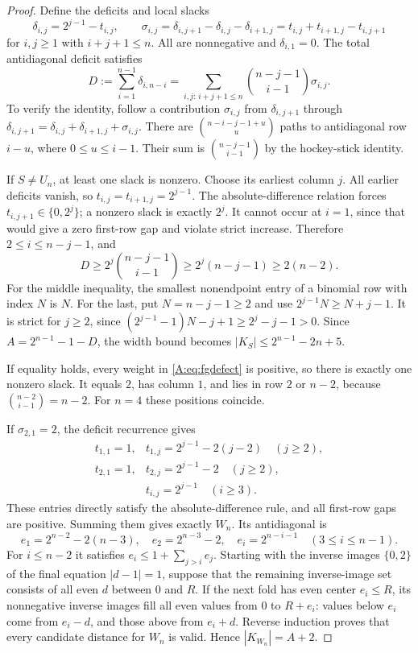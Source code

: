 \documentclass[11pt,a4paper]{article}
\theoremstyle{definition}
\theoremstyle{remark}
\numberwithin{equation}{section}
\begin{document}
\begin{proof}
Define the deficits and local slacks
\[
 \delta_{i,j}=2^{j-1}-t_{i,j},\qquad
 \sigma_{i,j}=\delta_{i,j+1}-\delta_{i,j}-\delta_{i+1,j}
             =t_{i,j}+t_{i+1,j}-t_{i,j+1}
\]
for $i,j\ge1$ with $i+j+1\le n$. All are nonnegative and
$\delta_{i,1}=0$. The total antidiagonal deficit satisfies
\begin{equation}\label{A:eq:fgdefect}
 D:=\sum_{i=1}^{n-1}\delta_{i,n-i}
   =\sum_{i,j:\,i+j+1\le n}
     \binom{n-j-1}{i-1}\sigma_{i,j}.
\end{equation}
To verify the identity, follow a contribution $\sigma_{i,j}$ from
$\delta_{i,j+1}$ through
$\delta_{i,j+1}=\delta_{i,j}+\delta_{i+1,j}+\sigma_{i,j}$.
There are $\binom{n-i-j-1+u}{u}$ paths to antidiagonal row $i-u$,
where $0\le u\le i-1$. Their sum is
$\binom{n-j-1}{i-1}$ by the hockey-stick identity.

If $S\ne U_n$, at least one slack is nonzero. Choose its earliest
column $j$. All earlier deficits vanish, so
$t_{i,j}=t_{i+1,j}=2^{j-1}$. The absolute-difference relation forces
$t_{i,j+1}\in\{0,2^j\}$; a nonzero slack is exactly $2^j$.
It cannot occur at $i=1$, since that would give a zero first-row gap
and violate strict increase. Therefore $2\le i\le n-j-1$, and
\[
 D\ge2^j\binom{n-j-1}{i-1}
   \ge2^j(n-j-1)\ge2(n-2).
\]
For the middle inequality, the smallest nonendpoint entry of a binomial
row with index $N$ is $N$. For the last, put $N=n-j-1\ge2$ and use
$2^{j-1}N\ge N+j-1$. It is strict for $j\ge2$, since
$(2^{j-1}-1)N-j+1\ge2^j-j-1>0$.
Since $A=2^{n-1}-1-D$, the width bound becomes
$|K_S|\le2^{n-1}-2n+5$.

If equality holds, every weight in \eqref{A:eq:fgdefect} is positive,
so there is exactly one nonzero slack. It equals $2$, has column $1$,
and lies in row $2$ or $n-2$, because
$\binom{n-2}{i-1}=n-2$. For $n=4$ these positions coincide.

If $\sigma_{2,1}=2$, the deficit recurrence gives
\[
 \begin{array}{ll}
 t_{1,1}=1,&t_{1,j}=2^{j-1}-2(j-2)\quad(j\ge2),\\
 t_{2,1}=1,&t_{2,j}=2^{j-1}-2\quad(j\ge2),\\
 &t_{i,j}=2^{j-1}\quad(i\ge3).
 \end{array}
\]
These entries directly satisfy the absolute-difference rule, and all
first-row gaps are positive. Summing them gives exactly $W_n$.
Its antidiagonal is
\[
 e_1=2^{n-2}-2(n-3),\quad e_2=2^{n-3}-2,\quad
 e_i=2^{n-i-1}\quad(3\le i\le n-1).
\]
For $i\le n-2$ it satisfies $e_i\le1+\sum_{j>i}e_j$.
Starting with the inverse images $\{0,2\}$ of the final equation
$|d-1|=1$, suppose that the remaining inverse-image set consists of
all even $d$ between $0$ and $R$. If the next fold has even center
$e_i\le R$, its nonnegative inverse images fill all even values from
$0$ to $R+e_i$: values below $e_i$ come from $e_i-d$, and those above
from $e_i+d$. Reverse induction proves that every candidate distance
for $W_n$ is valid. Hence $|K_{W_n}|=A+2$.


\end{proof}
\end{document}
